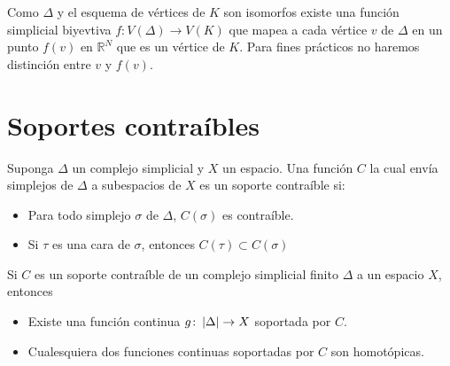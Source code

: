 Como $\Delta$ y el esquema de vértices de $K$ son isomorfos existe una función simplicial biyevtiva $f\colon V(\Delta)\rightarrow V(K)$ que mapea a cada vértice $v$ de $\Delta$ en un punto $f(v)$ en $\mathbb{R}^N$ que es un vértice de $K$. Para fines prácticos no haremos distinción entre $v$ y $f(v)$.

\section{Soportes contraíbles}
\begin{Defi}
Suponga $\Delta$ un complejo simplicial y $X$ un espacio. Una función $C$ la cual envía simplejos de $\Delta$ a subespacios de $X$ es un soporte contraíble si:
\begin{itemize}
\item Para todo simplejo $\sigma$ de $\Delta$, $C(\sigma)$ es contraíble.
\item Si $\tau$ es una cara de $\sigma$, entonces $C(\tau)\subset C(\sigma)$
\end{itemize}
\end{Defi}

\begin{Teo}
Si $C$ es un soporte contraíble de un complejo simplicial finito $\Delta$ a un espacio $X$, entonces
\begin{itemize}
\item Existe una función continua $g\colon \left| \Delta \right|\rightarrow X$ soportada por $C$.
\item Cualesquiera dos funciones continuas soportadas por $C$ son homotópicas.
\end{itemize}
\end{Teo}
